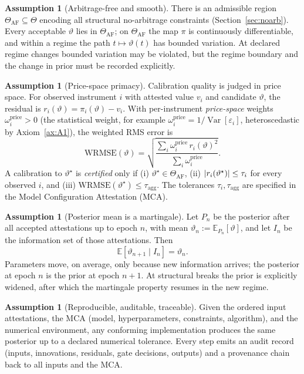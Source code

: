 \documentclass[11pt]{book}
\theoremstyle{plain}
\theoremstyle{definition}
\newtheorem{assumption}[theorem]{Assumption}
\theoremstyle{remark}
\newcommand{\parvec}{\vartheta}                  %
\newcommand{\E}{\mathbb{E}}
\newcommand{\Var}{\operatorname{Var}}
\DeclarePairedDelimiter{\abs}{\lvert}{\rvert}
\begin{document}
\begin{assumption}[Arbitrage-free and smooth]
\label{ax:A3}
There is an admissible region $\Theta_{\mathrm{AF}}\subseteq\Theta$ encoding all
structural no-arbitrage constraints (Section~\ref{sec:noarb}). Every acceptable
$\parvec$ lies in $\Theta_{\mathrm{AF}}$; on $\Theta_{\mathrm{AF}}$ the map $\pi$
is continuously differentiable, and within a regime the path
$t\mapsto\parvec(t)$ has bounded variation. At declared regime changes bounded
variation may be violated, but the regime boundary and the change in prior must
be recorded explicitly.
\end{assumption}

\begin{assumption}[Price-space primacy]
\label{ax:A4}
Calibration quality is judged in price space. For observed instrument $i$ with
attested value $v_i$ and candidate $\parvec$, the residual is
$r_i(\parvec)=\pi_i(\parvec)-v_i$. With per-instrument \emph{price-space} weights
$\omega_i^{\text{price}}>0$ (the statistical weight, for example
$\omega_i^{\text{price}}=1/\Var[\varepsilon_i]$, heteroscedastic by
Axiom~\ref{ax:A1}), the weighted RMS error is
\[
    \mathrm{WRMSE}(\parvec)
    = \sqrt{\frac{\sum_i \omega_i^{\text{price}}\,r_i(\parvec)^2}
                 {\sum_i \omega_i^{\text{price}}}} .
\]
A calibration to $\parvec^\star$ is \emph{certified} only if
(i) $\parvec^\star\in\Theta_{\mathrm{AF}}$,
(ii) $\abs{r_i(\parvec^\star)}\le\tau_i$ for every observed $i$, and
(iii) $\mathrm{WRMSE}(\parvec^\star)\le\tau_{\mathrm{agg}}$. The tolerances
$\tau_i,\tau_{\mathrm{agg}}$ are specified in the Model Configuration
Attestation (MCA).
\end{assumption}

\begin{assumption}[Posterior mean is a martingale]
\label{ax:A5}
Let $P_n$ be the posterior after all accepted attestations up to epoch $n$, with
mean $\parvec_n:=\E_{P_n}[\parvec]$, and let $I_n$ be the information set of those
attestations. Then
\[
    \E[\parvec_{n+1}\mid I_n] = \parvec_n .
\]
Parameters move, on average, only because new information arrives; the posterior
at epoch $n$ is the prior at epoch $n+1$. At structural breaks the prior is
explicitly widened, after which the martingale property resumes in the new
regime.
\end{assumption}

\begin{assumption}[Reproducible, auditable, traceable]
\label{ax:A6}
Given the ordered input attestations, the MCA (model, hyperparameters,
constraints, algorithm), and the numerical environment, any conforming
implementation produces the same posterior up to a declared numerical tolerance.
Every step emits an audit record (inputs, innovations, residuals, gate
decisions, outputs) and a provenance chain back to all inputs and the MCA.
\end{assumption}
\end{document}
